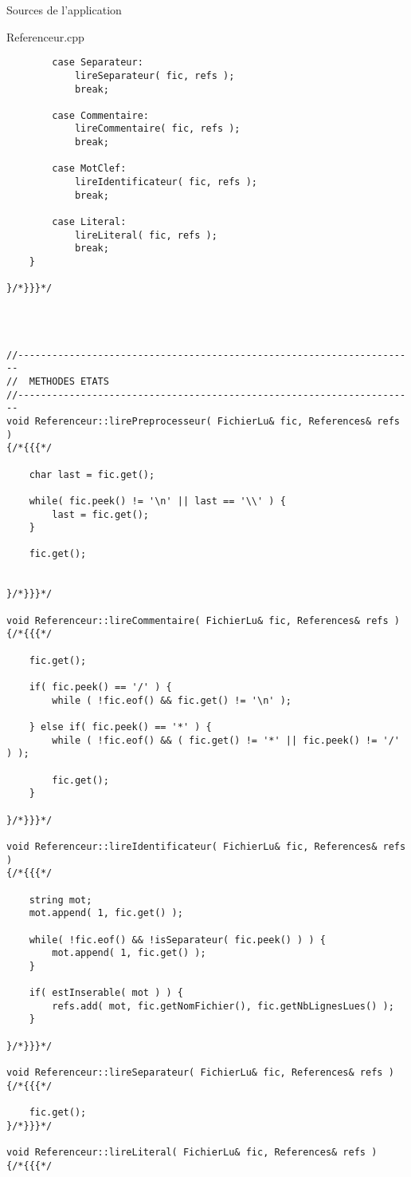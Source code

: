 \documentclass{article}
\begin{document}
\begin{section}{Sources de l'application}
\begin{paragraph}{Referenceur.cpp}
\begin{verbatim}
        case Separateur:
            lireSeparateur( fic, refs );
            break;

        case Commentaire:
            lireCommentaire( fic, refs );
            break;

        case MotClef:
            lireIdentificateur( fic, refs );
            break;

        case Literal:
            lireLiteral( fic, refs );
            break;
    }

}/*}}}*/




//----------------------------------------------------------------------
//  METHODES ETATS
//----------------------------------------------------------------------
void Referenceur::lirePreprocesseur( FichierLu& fic, References& refs )
{/*{{{*/

    char last = fic.get();

    while( fic.peek() != '\n' || last == '\\' ) {
        last = fic.get();
    }

    fic.get();


}/*}}}*/

void Referenceur::lireCommentaire( FichierLu& fic, References& refs )
{/*{{{*/

    fic.get();

    if( fic.peek() == '/' ) {
        while ( !fic.eof() && fic.get() != '\n' );

    } else if( fic.peek() == '*' ) {
        while ( !fic.eof() && ( fic.get() != '*' || fic.peek() != '/' ) );

        fic.get();
    }

}/*}}}*/

void Referenceur::lireIdentificateur( FichierLu& fic, References& refs )
{/*{{{*/

    string mot;
    mot.append( 1, fic.get() );

    while( !fic.eof() && !isSeparateur( fic.peek() ) ) {
        mot.append( 1, fic.get() );
    }

    if( estInserable( mot ) ) {
        refs.add( mot, fic.getNomFichier(), fic.getNbLignesLues() );
    }

}/*}}}*/

void Referenceur::lireSeparateur( FichierLu& fic, References& refs )
{/*{{{*/

    fic.get();
}/*}}}*/

void Referenceur::lireLiteral( FichierLu& fic, References& refs )
{/*{{{*/


\end{verbatim}
\end{paragraph}
\end{section}
\end{document}
